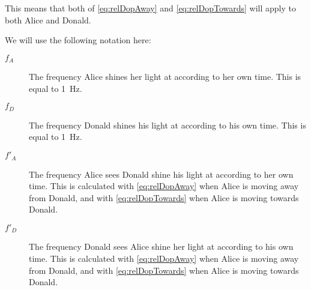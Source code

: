 		This means that both of \eqref{eq:relDopAway} and \eqref{eq:relDopTowards} will apply to both Alice and Donald.

		We will use the following notation here:
		\begin{description}
			\item[$f_A$] The frequency Alice shines her light at according to her own time. This is equal to \SI{1}{\Hz}.
			\item[$f_D$] The frequency Donald shines his light at according to his own time. This is equal to \SI{1}{\Hz}.
			\item[$f'_A$] The frequency Alice sees Donald shine his light at according to her own time. This is calculated with \eqref{eq:relDopAway} when Alice is moving away from Donald, and with \eqref{eq:relDopTowards} when Alice is moving towards Donald.
			\item[$f'_D$] The frequency Donald sees Alice shine her light at according to his own time. This is calculated with \eqref{eq:relDopAway} when Alice is moving away from Donald, and with \eqref{eq:relDopTowards} when Alice is moving towards Donald.
		\end{description}

